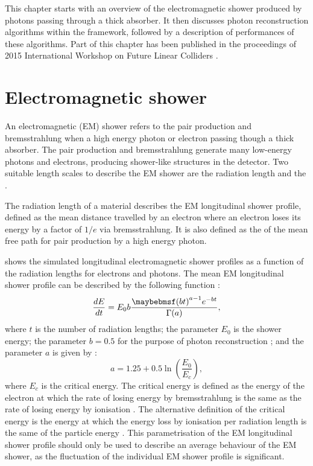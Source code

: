 This chapter starts with an overview of the electromagnetic shower produced by photons passing through a thick absorber. It then discusses photon reconstruction algorithms within the \pandora framework, followed by a description of performances of these algorithms.  Part of this chapter has been published in the proceedings of 2015 International Workshop on Future Linear Colliders \cite{Xu:2016rcz}.




\section{Electromagnetic shower}
\label{sec:photonEMshower}
An electromagnetic (EM) shower refers to the pair production and bremsstrahlung when a high energy photon or electron passing though a thick absorber. The pair production and bremsstrahlung generate many low-energy photons and electrons, producing shower-like  structures in the detector. Two suitable length scales to describe the EM shower are the radiation length and the \RM \cite{PhysRev.149.201,Bathow:1970dn}.

The radiation length of a material describes the EM longitudinal  shower profile, defined as the mean distance travelled by an electron where an electron loses its energy by a factor of $1/e$ via bremsstrahlung. It is also defined as the  of the mean free path  for pair production by a high energy photon\cite{segre1977nuclei}.


 shows the simulated longitudinal electromagnetic shower profiles as a function of the radiation lengths for electrons and photons. The mean EM longitudinal shower profile can be described by the following function \cite{Longo:1975wb} :
\begin{equation}
\frac{dE}{dt} = E_0 b \frac{\parenths{bt}^{a-1}e^{-bt}}{\Gamma(a)},
\label{eq:photonEMshower}
\end{equation}
where $t$ is the number of radiation lengths; the parameter $E_0$ is the shower energy; the parameter $b = 0.5$ for the purpose of photon reconstruction \cite{Agashe:2014kda}; and the parameter $a$ is given by \cite{Thomson:2009rp}:
\begin{equation}
a = 1.25 + 0.5\ln\left(\frac{E_0}{E_c}\right),
\end{equation}
where $E_c$ is the critical energy. The critical energy is defined as the energy of the electron at which the rate of losing energy by bremsstrahlung is the same as the rate of losing energy by ionisation \cite{1964NASSP3012.....B}. The alternative definition of the critical energy is the energy at which the energy loss by ionisation per radiation length is the same of the particle energy \cite{rossi1952high}. This parametrisation of the EM longitudinal shower profile should only be used to describe an average behaviour of the EM shower, as the fluctuation of the individual EM shower profile is significant.

